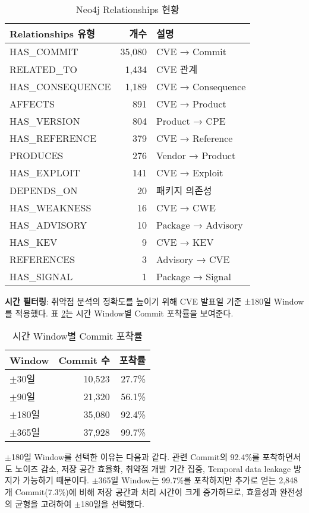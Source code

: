 ﻿\documentclass[conference]{IEEEtran}
\begin{document}
\begin{table}[h]
\centering
\caption{Neo4j Relationships 현황}
\label{tab:neo4j_relationships}
\begin{tabular}{lrl}
\toprule
\textbf{Relationships 유형} & \textbf{개수} & \textbf{설명} \\
\midrule
HAS\_COMMIT & 35,080 & CVE → Commit \\
RELATED\_TO & 1,434 & CVE 관계 \\
HAS\_CONSEQUENCE & 1,189 & CVE → Consequence \\
AFFECTS & 891 & CVE → Product \\
HAS\_VERSION & 804 & Product → CPE \\
HAS\_REFERENCE & 379 & CVE → Reference \\
PRODUCES & 276 & Vendor → Product \\
HAS\_EXPLOIT & 141 & CVE → Exploit \\
DEPENDS\_ON & 20 & 패키지 의존성 \\
HAS\_WEAKNESS & 16 & CVE → CWE \\
HAS\_ADVISORY & 10 & Package → Advisory \\
HAS\_KEV & 9 & CVE → KEV \\
REFERENCES & 3 & Advisory → CVE \\
HAS\_SIGNAL & 1 & Package → Signal \\
\bottomrule
\end{tabular}
\end{table}

\textbf{시간 필터링}: 취약점 분석의 정확도를 높이기 위해 CVE 발표일 기준 ±180일 Window를 적용했다. 표 \ref{tab:time_window}는 시간 Window별 Commit 포착률을 보여준다.

\begin{table}[h]
\centering
\caption{시간 Window별 Commit 포착률}
\label{tab:time_window}
\begin{tabular}{lrr}
\toprule
\textbf{Window} & \textbf{Commit 수} & \textbf{포착률} \\
\midrule
$\pm$30일 & 10,523 & 27.7\% \\
$\pm$90일 & 21,320 & 56.1\% \\
$\pm$180일 & 35,080 & 92.4\% \\
$\pm$365일 & 37,928 & 99.7\% \\
\bottomrule
\end{tabular}
\end{table}

$\pm$180일 Window를 선택한 이유는 다음과 같다. 관련 Commit의 92.4\%를 포착하면서도 노이즈 감소, 저장 공간 효율화, 취약점 개발 기간 집중, Temporal data leakage 방지가 가능하기 때문이다. $\pm$365일 Window는 99.7\%를 포착하지만 추가로 얻는 2,848개 Commit(7.3\%)에 비해 저장 공간과 처리 시간이 크게 증가하므로, 효율성과 완전성의 균형을 고려하여 $\pm$180일을 선택했다.
\end{document}
